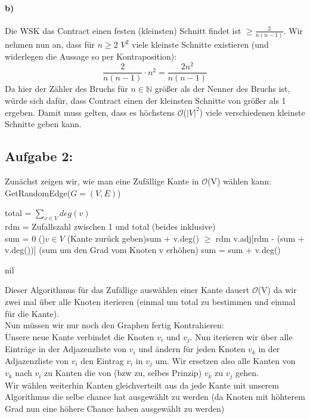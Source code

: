 \documentclass[a4paper]{article}
\def\Oh{\ensuremath{\mathcal{O}}} %
\begin{document}
\paragraph*{b)}
Die WSK das Contract einen festen (kleinsten) Schnitt findet ist $\geq \frac{2}{n (n - 1)}$. Wir nehmen nun an, dass 
für $n \geq 2$ $V^2$ viele kleinste Schnitte existieren (und widerlegen die Aussage so per Kontraposition): 
\[
    \frac{2}{n(n - 1)} \cdot n^2 = \frac{2n^2}{n(n - 1)}  
\]
Da hier der Zähler des Bruchs für $n \in \mathbb{N}$ größer als der Nenner des Bruchs ist, würde sich dafür,
dass Contract einen der kleinsten Schnitte von größer als 1 ergeben. Damit muss gelten, dass es höchstens
\Oh($|V|^2$) viele verschiedenen kleinste Schnitte geben kann.
\subsection*{Aufgabe 2:}
Zunächst zeigen wir, wie man eine Zufällige Kante in \Oh(V) wählen kann: \\
\noindent GetRandomEdge($G = (V, E)$)\\
\begin{algorithm}[H]
    total = $\sum_{v \in V} deg(v)$ \\
    rdm = Zufallszahl zwischen 1 und total (beides inklusive) \\
	sum = 0 \;
    \For(){$v \in V$}{
        \If(Kante zurück geben){sum + v.deg() $\geq$ rdm}{
            \Return v.adj[rdm - (sum + v.deg())]
        } \Else(sum um den Grad vom Knoten v erhöhen){
            sum = sum + v.deg()
        }
    }

	\Return nil\;
\end{algorithm}
Dieser Algorithmus für das Zufällige auswählen einer Kante dauert \Oh(V) da wir zwei mal über alle Knoten 
iterieren (einmal um total zu bestimmen und einmal für die Kante). \\
Nun müssen wir nur noch den Graphen fertig Kontrahieren: \\
Unsere neue Kante verbindet die Knoten $v_i$ und $v_j$. Nun iterieren wir über alle Einträge
in der Adjazenzliste von $v_i$ und ändern für jeden Knoten $v_k$ in der Adjazenzliste von $v_i$
den Eintrag $v_i$ in $v_j$ um. Wir ersetzen also alle Kanten von $v_k$ nach $v_i$ zu Kanten die 
von (bzw zu, selbes Prinzip) $v_k$ zu $v_j$ gehen. \\
Wir wählen weiterhin Kanten gleichverteilt aus da jede Kante mit unserem Algorithmus die selbe chance
hat ausgewählt zu werden (da Knoten mit höhterem Grad nun eine höhere Chance haben ausgewählt zu werden)
\end{document}
